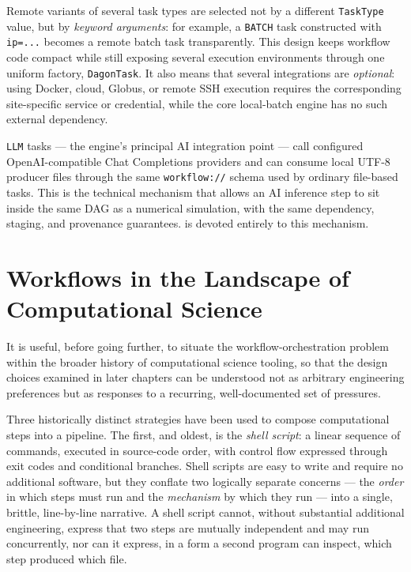 Remote variants of several task types are selected not by a different
\texttt{TaskType} value, but by \emph{keyword arguments}: for example, a
\texttt{BATCH} task constructed with \texttt{ip=...} becomes a remote batch
task transparently. This design keeps workflow code compact while still
exposing several execution environments through one uniform factory,
\texttt{DagonTask}. It also means that several integrations are
\emph{optional}: using Docker, cloud, Globus, or remote SSH execution
requires the corresponding site-specific service or credential, while the
core local-batch engine has no such external dependency.

\begin{practicebox}
\texttt{LLM} tasks --- the engine's principal AI integration point --- call
configured OpenAI-compatible Chat Completions providers and can consume local
UTF-8 producer files through the same \texttt{workflow://} schema used by
ordinary file-based tasks. This is the technical mechanism that allows an AI
inference step to sit inside the same DAG as a numerical simulation, with the
same dependency, staging, and provenance guarantees.  is
devoted entirely to this mechanism.
\end{practicebox}

\section{Workflows in the Landscape of Computational Science}

It is useful, before going further, to situate the workflow-orchestration
problem within the broader history of computational science tooling, so
that the design choices examined in later chapters can be understood not as
arbitrary engineering preferences but as responses to a recurring,
well-documented set of pressures.

Three historically distinct strategies have been used to compose
computational steps into a pipeline. The first, and oldest, is the
\emph{shell script}: a linear sequence of commands, executed in source-code
order, with control flow expressed through exit codes and conditional
branches. Shell scripts are easy to write and require no additional
software, but they conflate two logically separate concerns --- the
\emph{order} in which steps must run and the \emph{mechanism} by which they
run --- into a single, brittle, line-by-line narrative. A shell script
cannot, without substantial additional engineering, express that two steps
are mutually independent and may run concurrently, nor can it express, in a
form a second program can inspect, which step produced which file.

